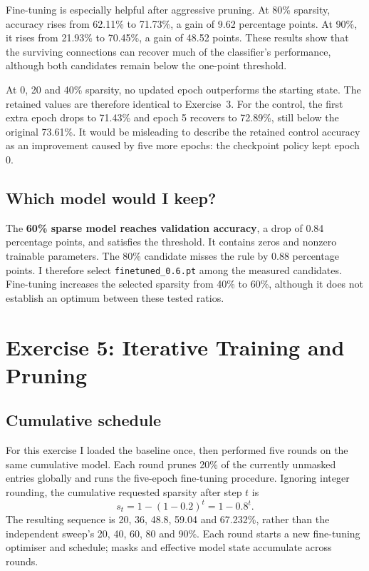 \documentclass[11pt,a4paper]{article}
\newcommand{\code}[1]{\texttt{#1}}
\begin{document}
Fine-tuning is especially helpful after aggressive pruning. At 80\% sparsity, accuracy rises from 62.11\% to 71.73\%, a gain of 9.62 percentage points. At 90\%, it rises from 21.93\% to 70.45\%, a gain of 48.52 points. These results show that the surviving connections can recover much of the classifier's performance, although both candidates remain below the one-point threshold.

At 0, 20 and 40\% sparsity, no updated epoch outperforms the starting state. The retained values are therefore identical to Exercise~3. For the control, the first extra epoch drops to 71.43\% and epoch 5 recovers to 72.89\%, still below the original 73.61\%. It would be misleading to describe the retained control accuracy as an improvement caused by five more epochs: the checkpoint policy kept epoch 0.

\subsection{Which model would I keep?}

The \textbf{60\% sparse model reaches \SelectedVal{} validation accuracy}, a drop of 0.84 percentage points, and satisfies the \Threshold{} threshold. It contains \SelectedZeros{} zeros and \SelectedNonzero{} nonzero trainable parameters. The 80\% candidate misses the rule by 0.88 percentage points. I therefore select \code{finetuned\_0.6.pt} among the measured candidates. Fine-tuning increases the selected sparsity from 40\% to 60\%, although it does not establish an optimum between these tested ratios.

\section{Exercise 5: Iterative Training and Pruning}

\subsection{Cumulative schedule}

For this exercise I loaded the baseline once, then performed five rounds on the same cumulative model. Each round prunes 20\% of the currently unmasked entries globally and runs the five-epoch fine-tuning procedure. Ignoring integer rounding, the cumulative requested sparsity after step $t$ is
\begin{equation}
 s_t=1-(1-0.2)^t=1-0.8^t.
\end{equation}
The resulting sequence is 20, 36, 48.8, 59.04 and 67.232\%, rather than the independent sweep's 20, 40, 60, 80 and 90\%. Each round starts a new fine-tuning optimiser and schedule; masks and effective model state accumulate across rounds.
\end{document}
